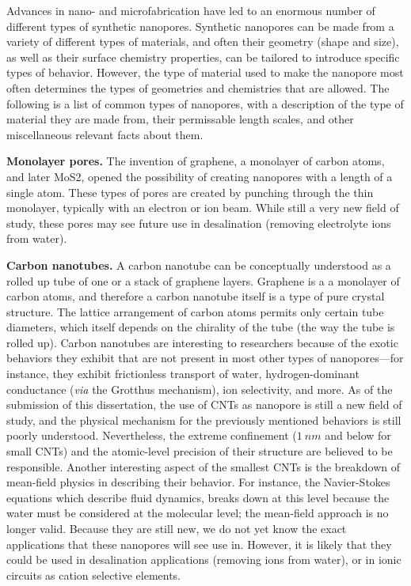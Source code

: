 			Advances in nano- and microfabrication have led to an enormous number of different types of synthetic nanopores. Synthetic nanopores can be made from a variety of different types of materials, and often their geometry (shape and size), as well as their surface chemistry properties, can be tailored to introduce specific types of behavior. However, the type of material used to make the nanopore most often determines the types of geometries and chemistries that are allowed. The following is a list of common types of nanopores, with a description of the type of material they are made from, their permissable length scales, and other miscellaneous relevant facts about them.

			\textbf{Monolayer pores.} The invention of graphene, a monolayer of carbon atoms, and later MoS2, opened the possibility of creating nanopores with a length of a single atom. These types of pores are created by punching through the thin monolayer, typically with an electron or ion beam. While still a very new field of study, these pores may see future use in desalination (removing electrolyte ions from water).

			\textbf{Carbon nanotubes.} A carbon nanotube can be conceptually understood as a rolled up tube of one or a stack of graphene layers. Graphene is a a monolayer of carbon atoms, and therefore a carbon nanotube itself is a type of pure crystal structure. The lattice arrangement of carbon atoms permits only certain tube diameters, which itself depends on the chirality of the tube (the way the tube is rolled up). Carbon nanotubes are interesting to researchers because of the exotic behaviors they exhibit that are not present in most other types of nanopores---for instance, they exhibit frictionless transport of water, hydrogen-dominant conductance (\textit{via} the Grotthus mechanism), ion selectivity, and more. As of the submission of this dissertation, the use of CNTs as nanopore is still a new field of study, and the physical mechanism for the previously mentioned behaviors is still poorly understood. Nevertheless, the extreme confinement ($\SI{1}{nm}$ and below for small CNTs) and the atomic-level precision of their structure are believed to be responsible. Another interesting aspect of the smallest CNTs is the breakdown of mean-field physics in describing their behavior. For instance, the Navier-Stokes equations which describe fluid dynamics, breaks down at this level because the water must be considered at the molecular level; the mean-field approach is no longer valid. Because they are still new, we do not yet know the exact applications that these nanopores will see use in. However, it is likely that they could be used in desalination applications (removing ions from water), or in ionic circuits as cation selective elements.

